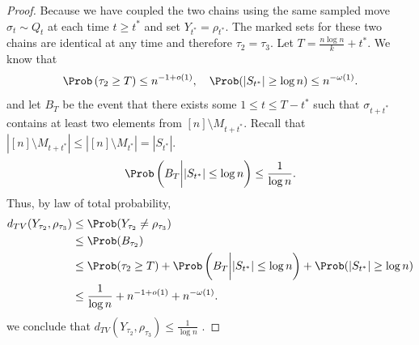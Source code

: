 \begin{proof}
    Because we have coupled the two chains using the same sampled move $\sigma_t \sim Q_t$ at each time $t \geq t^*$ and set $Y_{t^*} = \rho_{t^*}$. The marked sets for these two chains are identical at any time and therefore $\tau_2 = \tau_3$.   
    Let $T = \frac{n \log n}{k} + t^*$. We know that
    \[
    \Prob\left(\tau_2  \geq T \right) \leq n^{-1+o(1)},\quad \Prob(|S_{t^*}| \geq \log n) \leq n ^{- \omega(1)}.
    \]
    and let $B_T$ be the event that there exists some $1 \leq t \leq T - t^*$ such that $\sigma_{t+t^*}$ contains at least two elements from $[n] \setminus M_{t+t^*}$. Recall that $|[n] \setminus M_{t+t^*}| \leq |[n] \setminus M_{t^*}| = |S_{t^*}|$.
    \[
    \Prob \left( B_T \bigg| |S_{t^*}| \leq \log n \right) \leq \frac{1}{\log n}.
    \]
Thus, by law of total probability, 
\[
\begin{split}
    d_{TV}(Y_{\tau_2}, \rho_{\tau_3}) &\leq  \Prob(Y_{\tau_2} \neq \rho_{\tau_3}) \\
    &\leq \Prob(B_{\tau_2})\\
    &\leq \Prob(\tau_2 \geq T) + \Prob \left( B_T \bigg| |S_{t^*}| \leq \log n \right)+ \Prob(|S_{t^*}| \geq \log n)\\
    &\leq \frac{1}{\log n}+n^{-1+o(1)} + n^{-\omega(1)}.
\end{split}
\]
we conclude that $d_{TV}(Y_{\tau_2}, \rho_{\tau_3}) \leq \frac{1}{\log n}$ .
\end{proof}





